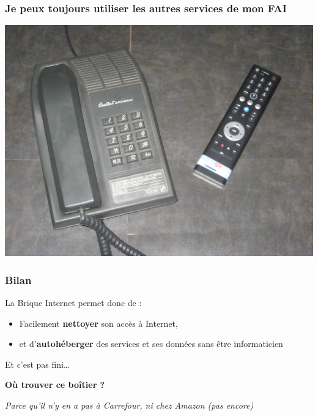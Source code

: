 \documentclass[notes=hide]{beamer}
\begin{document}
\begin{frame}[t]
\frametitle{\textcolor{titre}{Je peux toujours utiliser les autres services de mon FAI}}
\begin{center}
\vfill
\includegraphics[width=.75\textwidth]{img2/13-photo-teltv.jpg}
\vfill
\end{center}
\end{frame}

\begin{frame}[t]
\frametitle{\textcolor{titre}{Bilan}}
  \begin{center}
    La Brique Internet permet donc de :
    \vfill
    \begin{itemize}
      \item Facilement \textbf{nettoyer} son accès à Internet,
      \item et d'\textbf{autohéberger} des services et ses données sans être informaticien
    \end{itemize}
    \end{center}
    \vfill
    \pause
    Et c'est pas fini…
\end{frame}

\begin{frame}[t]{}
\begin{center}
\vfill
{\Huge \textbf{Où trouver ce boîtier ?}}
\vspace{.5cm}

{\large \emph{Parce qu'il n'y en a pas à Carrefour, ni chez Amazon (pas encore)}}
\vfill
\end{center}
\end{frame}
\end{document}
